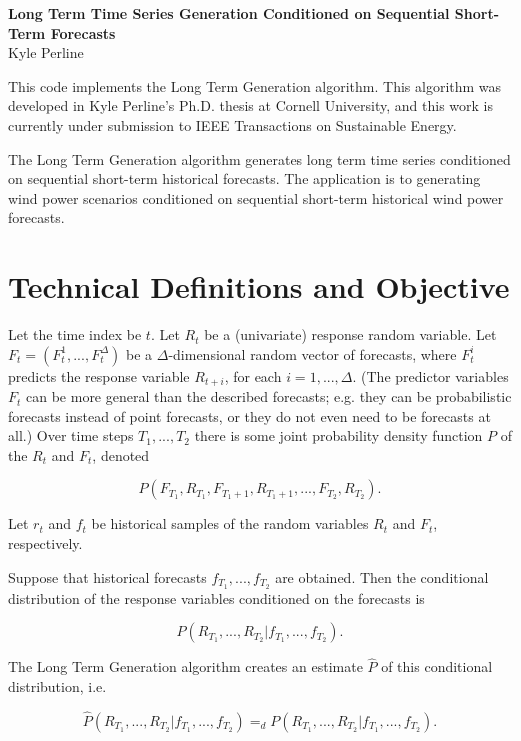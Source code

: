 \documentclass[10pt,a4paper]{article}
\begin{document}
\begin{center}
\Large\textbf{Long Term Time Series Generation Conditioned on Sequential Short-Term Forecasts} \\
\large{Kyle Perline}
\end{center}



This code implements the Long Term Generation algorithm.  This algorithm was developed in Kyle Perline's Ph.D. thesis at Cornell University, and this work is currently under submission to IEEE Transactions on Sustainable Energy.

The Long Term Generation algorithm generates long term time series conditioned on sequential short-term historical forecasts. The application is to generating wind power scenarios conditioned on sequential short-term historical wind power forecasts.

\section{Technical Definitions and Objective}

Let the time index be $t$.  Let $R_t$ be a (univariate) response random variable. Let $F_t=(F_t^1,...,F_t^{\Delta})$ be a $\Delta$-dimensional random vector of forecasts, where $F_t^i$ predicts the response variable $R_{t+i}$, for each $i=1,...,\Delta$. (The predictor variables $F_t$ can be more general than the described forecasts; e.g. they can be probabilistic forecasts instead of point forecasts, or they do not even need to be forecasts at all.) Over time steps $T_1,...,T_2$ there is some joint probability density function $P$ of the $R_t$ and $F_t$, denoted

$$ P(F_{T_1},R_{T_1},F_{T_1+1},R_{T_1+1},...,F_{T_2},R_{T_2}). $$

\noindent Let $r_t$ and $f_t$ be historical samples of the random variables $R_t$ and $F_t$, respectively.

Suppose that historical forecasts $f_{T_1},...,f_{T_2}$ are obtained.  Then the conditional distribution of the response variables conditioned on the forecasts is

$$ P(R_{T_1},...,R_{T_2} | f_{T_1},...,f_{T_2}). $$

The Long Term Generation algorithm creates an estimate $\hat{P}$ of this conditional distribution, i.e.

$$ \hat{P}(R_{T_1},...,R_{T_2} | f_{T_1},...,f_{T_2}) =_d P(R_{T_1},...,R_{T_2} | f_{T_1},...,f_{T_2}). $$
\end{document}
